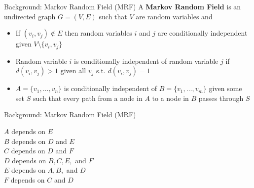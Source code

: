 \documentclass{beamer}
\begin{document}

\begin{frame}{Background: Markov Random Field (MRF)}
	A \textbf{Markov Random Field} is an undirected graph $G = (V,E)$ such that $V$ are random variables and
	\begin{itemize}
		\item If $(v_i,v_j) \not\in E$ then random variables $i$ and $j$ are conditionally independent given $V \setminus \{v_i,v_j\}$
		\item Random variable $i$ is conditionally independent of random variable $j$ if $d(v_i,v_j) > 1$ given all $v_j$ s.t. $d(v_i,v_j) = 1$
		\item $A = \{v_1, \dots, v_n\}$ is conditionally independent of $B = \{v_1, \dots, v_m\}$ given some set $S$ such that every path from a node in $A$ to a node in $B$ passes through $S$ 
	\end{itemize}
\end{frame}


\begin{frame}{Background: Markov Random Field (MRF)}
\begin{minipage}{.475\textwidth}
	$A$ depends on $E$ \\
	$B$ depends on $D$ and $E$ \\
	$C$ depends on $D$ and $F$ \\
	$D$ depends on $B, C, E,$ and $F$ \\
	$E$ depends on $A, B,$ and $D$ \\
	$F$ depends on $C$ and $D$ \\ 
\end{minipage}%
\hspace{.05cm}
\begin{minipage}{.475\textwidth}
\begin{center}
\end{center}
\end{minipage}
\end{frame}
\end{document}

